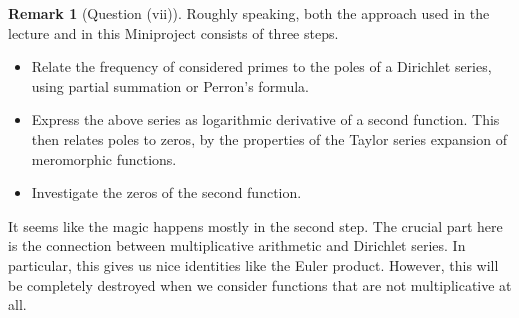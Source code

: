 \documentclass{scrartcl}
\theoremstyle{definition}
\newtheorem{remark}[definition]{Remark}
\begin{document}
\begin{remark}[Question (vii)]
    Roughly speaking, both the approach used in the lecture and in this Miniproject consists of three steps.
    \begin{itemize}
        \item Relate the frequency of considered primes to the poles of a Dirichlet series, using partial summation or Perron's formula.

        \item Express the above series as logarithmic derivative of a second function.
        This then relates poles to zeros, by the properties of the Taylor series expansion of meromorphic functions.

        \item Investigate the zeros of the second function.
    \end{itemize}

    It seems like the magic happens mostly in the second step.
    The crucial part here is the connection between multiplicative arithmetic and Dirichlet series.
    In particular, this gives us nice identities like the Euler product.
    However, this will be completely destroyed when we consider functions that are not multiplicative at all.


\end{remark}
\end{document}
